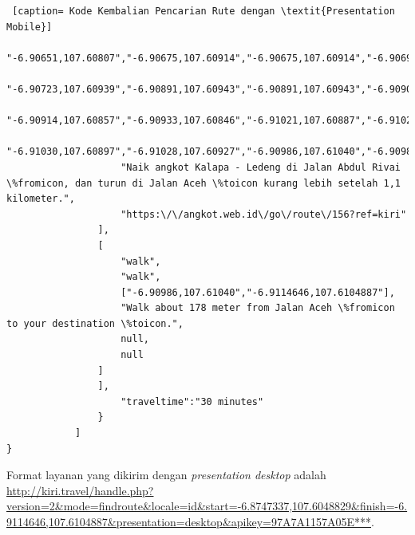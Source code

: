 \begin{lstlisting} [caption= Kode Kembalian Pencarian Rute dengan \textit{Presentation Mobile}]
					"-6.90651,107.60807","-6.90675,107.60914","-6.90675,107.60914","-6.90694,107.60939",
					"-6.90723,107.60939","-6.90891,107.60943","-6.90891,107.60943","-6.90909,107.60934",
					"-6.90914,107.60857","-6.90933,107.60846","-6.91021,107.60887","-6.91021,107.60887",
					"-6.91030,107.60897","-6.91028,107.60927","-6.90986,107.61040","-6.90986,107.61040"],
					"Naik angkot Kalapa - Ledeng di Jalan Abdul Rivai \%fromicon, dan turun di Jalan Aceh \%toicon kurang lebih setelah 1,1 kilometer.",
					"https:\/\/angkot.web.id\/go\/route\/156?ref=kiri"
				],
				[
					"walk",
					"walk",
					["-6.90986,107.61040","-6.9114646,107.6104887"],
					"Walk about 178 meter from Jalan Aceh \%fromicon to your destination \%toicon.",
					null,
					null
				]
				],
					"traveltime":"30 minutes"
				}
			]
}
\end{lstlisting}

Format layanan yang dikirim dengan \textit{presentation desktop} adalah \\
\url{http://kiri.travel/handle.php?version=2&mode=findroute&locale=id&start=-6.8747337,107.6048829&finish=-6.9114646,107.6104887&presentation=desktop&apikey=97A7A1157A05E***}.

